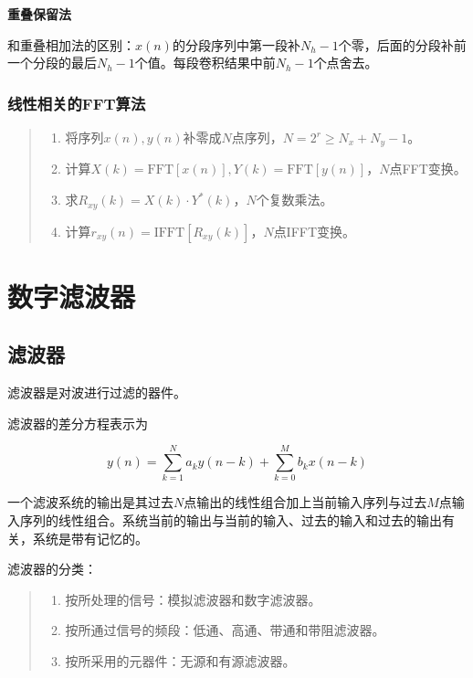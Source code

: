 \documentclass[cn, hazy, blue, normal, 14pt]{elegantnote}
\begin{document}
\textbf{重叠保留法}

和重叠相加法的区别：$x(n)$的分段序列中第一段补$N_h-1$个零，后面的分段补前一个分段的最后$N_h-1$个值。每段卷积结果中前$N_h-1$个点舍去。

\subsubsection{线性相关的FFT算法}

\begin{quote}
\begin{enumerate}
    \item 将序列$x(n), y(n)$补零成$N$点序列，$N=2^r\geq N_x+N_y-1$。
    \item 计算$X(k)=\text{FFT}[x(n)], Y(k)=\text{FFT}[y(n)]$，$N$点FFT变换。
    \item 求$R_{xy}(k)=X(k)\cdot Y^*(k)$，$N$个复数乘法。
    \item 计算$r_{xy}(n)=\text{IFFT}[R_{xy}(k)]$，$N$点IFFT变换。
\end{enumerate}
\end{quote}

\section{数字滤波器}

\subsection{滤波器}

滤波器是对波进行过滤的器件。

滤波器的差分方程表示为

\begin{equation}
    y(n)=\sum_{k=1}^{N}a_k y(n-k)+\sum_{k=0}^{M}b_k x(n-k)
\end{equation}

一个滤波系统的输出是其过去$N$点输出的线性组合加上当前输入序列与过去$M$点输入序列的线性组合。系统当前的输出与当前的输入、过去的输入和过去的输出有关，系统是带有记忆的。

滤波器的分类：

\begin{quote}
\begin{enumerate}
    \item 按所处理的信号：模拟滤波器和数字滤波器。
    \item 按所通过信号的频段：低通、高通、带通和带阻滤波器。
    \item 按所采用的元器件：无源和有源滤波器。
\end{enumerate}
\end{quote}
\end{document}
